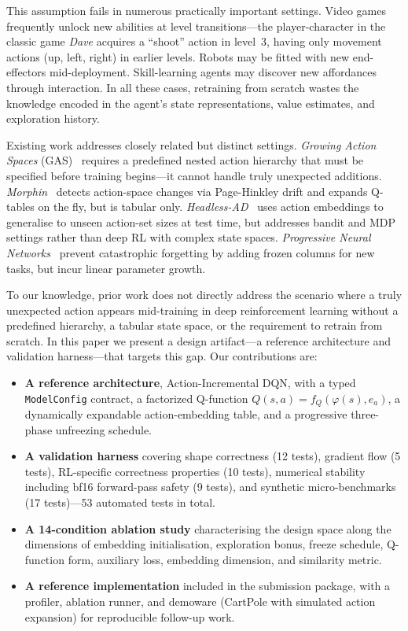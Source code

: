 \documentclass{article}
\begin{document}
This assumption fails in numerous practically important settings. Video games
frequently unlock new abilities at level transitions---the player-character in
the classic game \textit{Dave} acquires a ``shoot'' action in level~3, having
only movement actions (up, left, right) in earlier levels. Robots may be fitted
with new end-effectors mid-deployment. Skill-learning agents may discover new
affordances through interaction. In all these cases, retraining from scratch
wastes the knowledge encoded in the agent's state representations, value
estimates, and exploration history.

Existing work addresses closely related but distinct settings. \emph{Growing
Action Spaces} (GAS)~\cite{farquhar2020growing} requires a predefined nested
action hierarchy that must be specified before training begins---it cannot
handle truly unexpected additions. \emph{Morphin}~\cite{delarosa2026morphin}
detects action-space changes via Page-Hinkley drift and expands Q-tables on the
fly, but is tabular only. \emph{Headless-AD}~\cite{sinii2023headless} uses
action embeddings to generalise to unseen action-set sizes at test time, but
addresses bandit and MDP settings rather than deep RL with complex state
spaces. \emph{Progressive Neural
Networks}~\cite{rusu2016progressive} prevent catastrophic forgetting by adding
frozen columns for new tasks, but incur linear parameter growth.

To our knowledge, prior work does not directly address the scenario where a
truly unexpected action appears mid-training in deep reinforcement learning
without a predefined hierarchy, a tabular state space, or the requirement to
retrain from scratch. In this paper we present a design artifact---a reference
architecture and validation harness---that targets this gap. Our contributions
are:

\begin{itemize}
  \item \textbf{A reference architecture}, Action-Incremental DQN, with a typed
  \texttt{ModelConfig} contract, a factorized Q-function
  $Q(s,a)=f_Q(\varphi(s),e_a)$, a dynamically expandable action-embedding
  table, and a progressive three-phase unfreezing schedule.
  \item \textbf{A validation harness} covering shape correctness (12 tests),
  gradient flow (5 tests), RL-specific correctness properties (10 tests),
  numerical stability including bf16 forward-pass safety (9 tests), and
  synthetic micro-benchmarks (17 tests)---53 automated tests in total.
  \item \textbf{A 14-condition ablation study} characterising the design space
  along the dimensions of embedding initialisation, exploration bonus, freeze
  schedule, Q-function form, auxiliary loss, embedding dimension, and
  similarity metric.
  \item \textbf{A reference implementation} included in the submission package,
  with a profiler, ablation runner, and demoware (CartPole with simulated
  action expansion) for reproducible follow-up work.
\end{itemize}
\end{document}
